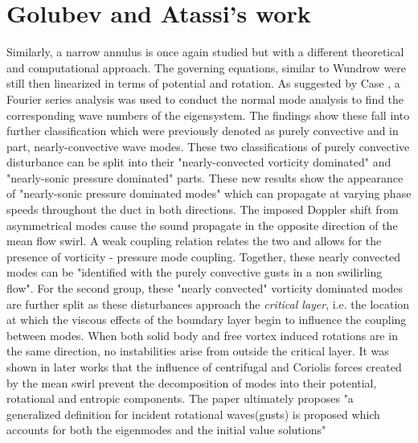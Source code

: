 \documentclass[conf]{new-aiaa}
\begin{document}
\section{Golubev and Atassi's work}
Similarly, a narrow annulus is once again studied but with a different theoretical and computational approach. The governing equations, similar to Wundrow \cite{Wundrow2019} were still then linearized in terms of potential and rotation. As suggested by Case \cite{Case1960}, a Fourier series analysis was used to conduct the normal mode analysis to find the corresponding wave numbers of the eigensystem. The findings show these fall into further classification which were previously denoted as purely convective and in part, nearly-convective wave modes. These two classifications of purely convective disturbance can be split into their "nearly-convected vorticity dominated" and "nearly-sonic pressure dominated" parts. These new results show the appearance of "nearly-sonic pressure dominated modes" which can propagate at varying phase speeds throughout the duct in both directions. The imposed Doppler shift from asymmetrical modes cause the sound propagate in the opposite direction of the mean flow swirl. A weak coupling relation relates the two and allows for the presence of vorticity - pressure mode coupling. Together, these nearly convected modes can be "identified with the purely convective gusts in a non swilirling flow". For the second group, these "nearly convected" vorticity dominated modes are further split as these disturbances approach the \textit{critical layer}, i.e. the location at which the viscous effects of the boundary layer begin to influence the coupling between modes. When both solid body and free vortex induced rotations are in the same direction, no instabilities arise from outside the critical layer. It was shown in later works that the influence of centrifugal and Coriolis forces created by the mean swirl prevent the decomposition of modes into their potential, rotational and entropic components. The paper ultimately proposes "a generalized definition for incident rotational waves(gusts) is proposed which accounts for both the eigenmodes and the initial value solutions" 
\end{document}
